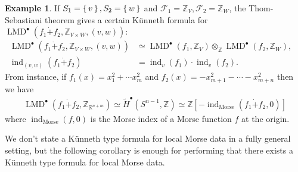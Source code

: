 \documentclass[a4paper,dvipdfmx,reqno,12pt]{amsart}
\theoremstyle{definition}
\newtheorem{example}[theorem]{Example}
\newcommand{\Z}{\mathbb{Z}}%
\newcommand{\mcal}[1]{\mathcal{#1}}%
\newcommand{\opn}[1]{\operatorname{#1}}
\numberwithin{equation}{section}
\begin{document}
\begin{example}
  If $S_1=\set{v},S_2=\set{w}$ and $\mcal{F}_1=\Z_V, \mcal{F}_2=\Z_{W}$,
  the Thom-Sebastiani theorem gives
  a certain K\"unneth formula for
  $\opn{LMD}^{\bullet}(f_1\dot{+}f_2,\Z_{V\times W},(v,w))$:
\begin{align}
\opn{LMD}^{\bullet}(f_1\dot{+}f_2,\Z_{V\times W},(v,w))
&\simeq \opn{LMD}^{\bullet}(f_1,\Z_{V})
\otimes_{\Z} \opn{LMD}^{\bullet}(f_2,\Z_{W}), \quad \\
\opn{ind}_{(v,w)}(f_1\dot{+}f_2)&=\opn{ind}_v(f_1)\cdot \opn{ind}_v(f_2).
\end{align}
  From instance, if $f_1(x)=x_1^{2}+\cdots x_{m}^{2}$
  and $f_2(x)=-x_{m+1}^{2}-\cdots - x_{m+n}^{2}$ then we have
\begin{align}
    \opn{LMD}^{\bullet}(f_1\dot{+}f_2,\Z_{{\mathbb{R}}^{n+m}})
    \simeq \tilde{H}^{\bullet}(S^{n-1},\Z)
    \simeq \Z[-\opn{ind}_{\mathrm{Morse}}(f_1\dot{+}f_2,0)]
\end{align}
  where $\opn{ind}_{\mathrm{Morse}}(f,0)$ is the Morse index
  of a Morse function $f$ at the origin.
\end{example}

We don't state a K\"unneth type formula for 
local Morse data in a fully
general setting, but the following corollary 
is enough for performing that there exists 
a K\"unneth type formula for local Morse data.
\end{document}
